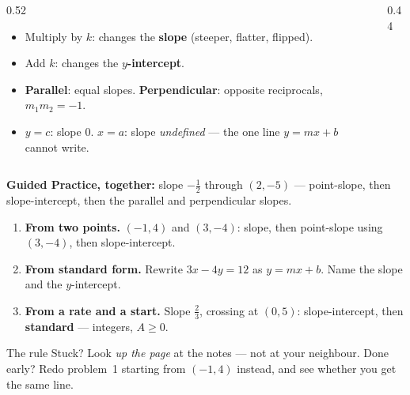 \documentclass[aspectratio=169, 11pt]{beamer}
\newcommand{\lgrid}[4]{%
  \draw[step=1, linegray!45, thin] (#1,#3) grid (#2,#4);
  \draw[->, thick, charcoal] (#1,0)--(#2,0) node[below right, font=\tiny]{$x$};
  \draw[->, thick, charcoal] (0,#3)--(0,#4) node[left, font=\tiny]{$y$};}
\begin{document}
\begin{frame}[t, plain]
  \begin{columns}[T]
    \begin{column}{0.52\textwidth}
      \begin{itemize}\setlength{\itemsep}{3pt}
        \item Multiply by $k$: changes the \textbf{slope} (steeper, flatter, flipped).
        \item Add $k$: changes the \textbf{$y$-intercept}.
        \item \textbf{Parallel}: equal slopes. \; \textbf{Perpendicular}: opposite reciprocals,
              $m_1m_2=-1$.
        \item $y=c$: slope $0$. \; $x=a$: slope \emph{undefined} --- the one line $y=mx+b$ cannot
              write.
      \end{itemize}
    \end{column}
    \begin{column}{0.44\textwidth}
      \centering
    \end{column}
  \end{columns}
  \vspace{3pt}
  \textbf{Guided Practice, together:} slope $-\tfrac12$ through $(2,-5)$ --- point-slope, then
  slope-intercept, then the parallel and perpendicular slopes.
\end{frame}

\begin{frame}[t, plain]
  \begin{enumerate}\setlength{\itemsep}{6pt}
    \item \textbf{From two points.} $(-1,4)$ and $(3,-4)$: slope, then point-slope using $(3,-4)$,
          then slope-intercept.
    \item \textbf{From standard form.} Rewrite $3x-4y=12$ as $y=mx+b$. Name the slope and the
          $y$-intercept.
    \item \textbf{From a rate and a start.} Slope $\tfrac23$, crossing at $(0,5)$: slope-intercept,
          then \textbf{standard} --- integers, $A \ge 0$.
  \end{enumerate}
  \vspace{5pt}
  \begin{block}{The rule}
    Stuck? Look \emph{up the page} at the notes --- not at your neighbour. Done early? Redo
    problem~1 starting from $(-1,4)$ instead, and see whether you get the same line.
  \end{block}
\end{frame}
\end{document}
